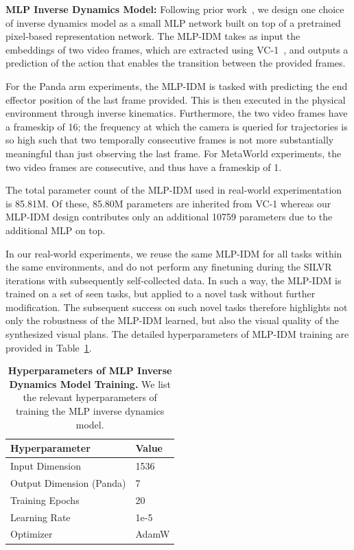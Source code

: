 \textbf{MLP Inverse Dynamics Model:} Following prior work~\citep{luo2025solving}, we design one choice of inverse dynamics model as a small MLP network built on top of a pretrained pixel-based representation network.  The MLP-IDM takes as input the embeddings of two video frames, which are extracted using VC-1~\citep{majumdar2023vc1}, and outputs a prediction of the action that enables the transition between the provided frames.

For the Panda arm experiments, the MLP-IDM is tasked with predicting the end effector position of the last frame provided.  This is then executed in the physical environment through inverse kinematics.  Furthermore, the two video frames have a frameskip of 16; the frequency at which the camera is queried for trajectories is so high such that two temporally consecutive frames is not more substantially meaningful than just observing the last frame.  For MetaWorld experiments, the two video frames are consecutive, and thus have a frameskip of 1.

The total parameter count of the MLP-IDM used in real-world experimentation is 85.81M. Of these, 85.80M parameters are inherited from VC-1 whereas our MLP-IDM design contributes only an additional 10759 parameters due to the additional MLP on top.

In our real-world experiments, we reuse the same MLP-IDM for all tasks within the same environments, and do not perform any finetuning during the SILVR iterations with subsequently self-collected data.  In such a way, the MLP-IDM is trained on a set of seen tasks, but applied to a novel task without further modification.  The subsequent success on such novel tasks therefore highlights not only the robustness of the MLP-IDM learned, but also the visual quality of the synthesized visual plans. The detailed hyperparameters of MLP-IDM training are provided in Table~\ref{table:inv_dyn_hparams}.

\begin{table}[ht]
\centering
\small

\begin{tabular}{@{}ll@{}}
\toprule
Hyperparameter    & Value \\ \midrule
Input Dimension  & 1536      \\
Output Dimension (Panda) & 7      \\
Training Epochs  & 20      \\
Learning Rate    & 1e-5      \\
Optimizer        & AdamW     \\ \bottomrule
\end{tabular}

\vspace{1em}
\caption{\textbf{Hyperparameters of MLP Inverse Dynamics Model Training.}  We list the relevant hyperparameters of training the MLP inverse dynamics model.}
\label{table:inv_dyn_hparams}
\end{table}

